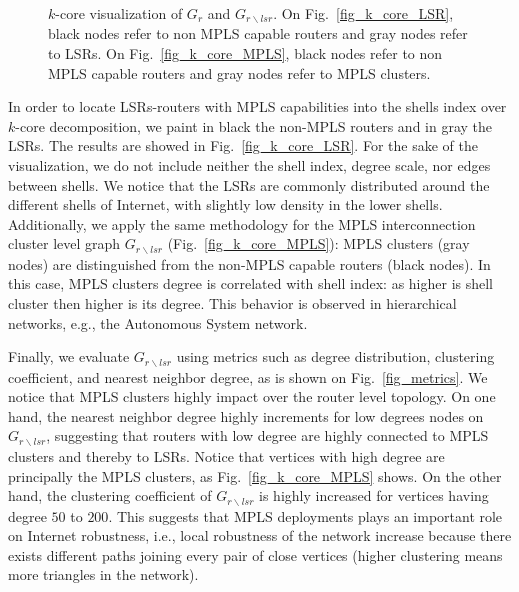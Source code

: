 \begin{figure*}[!t]
  \begin{center}
\hfil
  \end{center}
  \caption{$k$-core visualization of $G_r$ and $G_{r \backslash lsr}$.  On
  Fig.~\ref{fig_k_core_LSR}, black nodes refer to non MPLS capable routers and
  gray nodes refer to LSRs.  On Fig.~\ref{fig_k_core_MPLS}, black nodes refer to
  non MPLS capable routers and gray nodes refer to MPLS clusters.} 
  \label{fig_kcore_overview}
\end{figure*}

In order to locate LSRs-routers with MPLS capabilities into the shells index
over $k$-core decomposition, we paint in black the non-MPLS routers and in gray
the LSRs. The results are showed in Fig.~\ref{fig_k_core_LSR}.  For the sake of
the visualization, we do not include neither the shell index, degree scale, nor
edges between shells. We notice that the LSRs are commonly distributed around
the different shells of Internet, with slightly low density in the lower shells.
Additionally, we apply the same methodology for the MPLS interconnection cluster
level graph $G_{r\backslash lsr}$ (Fig.~\ref{fig_k_core_MPLS}): MPLS clusters
(gray nodes) are distinguished from the non-MPLS capable routers (black nodes).
In this case,  MPLS clusters  degree is correlated with shell index: as higher
is shell cluster then higher is its degree. This behavior is observed in
hierarchical networks, e.g., the Autonomous System network.


Finally, we evaluate $G_{r \backslash lsr }$ using metrics such as degree
distribution, clustering coefficient, and nearest neighbor degree, as is shown
on Fig.~\ref{fig_metrics}. We notice that MPLS clusters highly impact over the
router level topology. On one hand, the nearest neighbor degree highly
increments for low degrees nodes on $G_{r \backslash lsr}$, suggesting that
routers with low degree are highly connected to MPLS clusters and thereby to
LSRs. Notice that vertices with high degree are principally the MPLS clusters,
as Fig.~\ref{fig_k_core_MPLS} shows. On the other hand, the clustering
coefficient of $G_{r \backslash lsr }$ is highly increased for vertices having
degree $50$ to $200$. This suggests that MPLS deployments plays an important
role on Internet robustness, i.e., local robustness of the network increase
because there exists different paths joining every pair of close vertices
(higher clustering means more triangles in the network).

